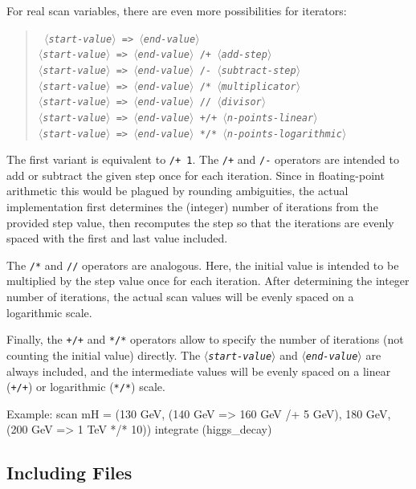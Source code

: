 \documentclass[12pt]{book}
\newenvironment{code}%
  {\begingroup\footnotesize
   \quote
   \verbatim}%
  {\endverbatim
   \endquote
   \endgroup\noindent}
\newenvironment{syntax}%
  {\begin{quote}
   \begin{flushleft}\tt}%
  {\end{flushleft}
   \end{quote}}
\newcommand{\var}[1]{$\langle$\textit{#1}$\rangle$}
\newcommand{\ttt}[1]{\texttt{#1}}
\begin{document}
For real scan variables, there are even more possibilities for iterators:
\begin{syntax}
\var{start-value} \verb|=>| \var{end-value} \\
\var{start-value} \verb|=>| \var{end-value} \verb|/+| \var{add-step} \\
\var{start-value} \verb|=>| \var{end-value} \verb|/-| \var{subtract-step} \\
\var{start-value} \verb|=>| \var{end-value} \verb|/*| \var{multiplicator} \\
\var{start-value} \verb|=>| \var{end-value} \verb|//| \var{divisor} \\
\var{start-value} \verb|=>| \var{end-value} \verb|+/+| \var{n-points-linear} \\
\var{start-value} \verb|=>| \var{end-value} \verb|*/*| \var{n-points-logarithmic} \\
\end{syntax}
The first variant is equivalent to \ttt{/+ 1}.  The \ttt{/+} and
\ttt{/-} operators are intended to add or subtract the given step once
for each iteration.  Since in floating-point arithmetic this would be
plagued by rounding ambiguities, the actual implementation first
determines the (integer) number of iterations from the provided step
value, then recomputes the step so that the iterations are evenly
spaced with the first and last value included.

The \ttt{/*} and \ttt{//} operators are analogous.  Here, the initial
value is intended to be multiplied by the step value once for each
iteration.  After determining the integer number of iterations, the
actual scan values will be evenly spaced on a logarithmic scale.

Finally, the \ttt{+/+} and \ttt{*/*} operators allow to specify the
number of iterations (not counting the initial value) directly.  The
\ttt{\var{start-value}} and \ttt{\var{end-value}} are always included,
and the intermediate values will be evenly spaced on a linear
(\ttt{+/+}) or logarithmic (\ttt{*/*}) scale.

Example:
\begin{code}
scan mH = (130 GeV, 
           (140 GeV => 160 GeV /+ 5 GeV), 
           180 GeV,
           (200 GeV => 1 TeV */* 10)) 
  {  integrate (higgs_decay) }
\end{code}


\subsection{Including Files}
\end{document}
